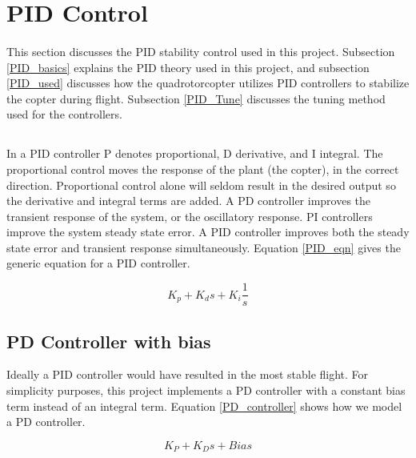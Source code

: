 \section{PID Control} %
\paragraph{}
This section discusses the PID stability control used in this project.  Subsection \ref{PID_basics} explains the PID theory used in this project, and subsection \ref{PID_used} discusses how the quadrotorcopter utilizes PID controllers to stabilize the copter during flight.  Subsection \ref{PID_Tune} discusses the tuning method used for the controllers.

\subsection{\label{PID_basics}}
\paragraph{}
In a PID controller P denotes proportional, D derivative, and I integral. The proportional control moves the response of the plant (the copter), in the correct direction. Proportional control alone will seldom result in the desired output so the derivative and integral terms are added. A PD controller improves the transient response of the system, or the oscillatory response.  PI controllers improve the system steady state error.  A PID controller improves both the steady state error and transient response simultaneously. Equation \ref{PID_eqn} gives the generic equation for a PID controller. 

\begin{equation}
K_p+K_ds + K_i\frac{1}{s}
\label{PID_eqn}
\end{equation}

\subsection{PD Controller with bias\label{PID_used}}

Ideally a PID controller would have resulted in the most stable flight.  For simplicity purposes, this project implements a PD controller with a constant bias term instead of an integral term.  Equation \ref{PD_controller} shows how we model a PD controller.

\begin{equation}
K_P+K_Ds+Bias
\label{PD_controller}
\end{equation}

